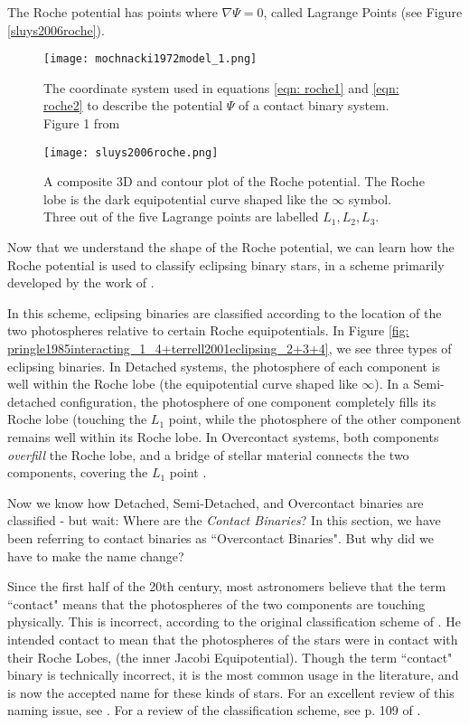 \documentclass[12pt]{article} %
\numberwithin{equation}{section} %
\begin{document}
The Roche potential has points where $\nabla \Psi = 0$, called Lagrange Points (see Figure \ref{sluys2006roche}). 

\begin{figure}[H]
\centering
\texttt{[image: mochnacki1972model\_1.png]}
\caption{The coordinate system used in equations \ref{eqn: roche1} and \ref{eqn: roche2} to describe the potential $\Psi$ of a contact binary system. Figure 1 from \citet{mochnacki1972model}}
\label{fig: mochnacki1972model_1}
\end{figure}

\begin{figure}[H]
\centering
\texttt{[image: sluys2006roche.png]}
\caption{A composite 3D and contour plot of the Roche potential. The Roche lobe is the dark equipotential curve shaped like the $\infty$ symbol. Three out of the five Lagrange points are labelled $L_{1}, L_{2}, L_{3}$.  \citep{sluys2006roche}}
\label{fig: sluys2006roche}
\end{figure}

Now that we understand the shape of the Roche potential, we can learn how the Roche potential is used to classify eclipsing binary stars, in a scheme primarily developed by the work of \citet{kopal1959close}.

In this scheme, eclipsing binaries are classified according to the location of the two photospheres relative to certain Roche equipotentials. In Figure \ref{fig: pringle1985interacting_1_4+terrell2001eclipsing_2+3+4}, we see three types of eclipsing binaries. In Detached systems, the photosphere of each component is well within the Roche lobe (the equipotential curve shaped like $\infty$). In a Semi-detached configuration, the photosphere of one component completely fills its Roche lobe (touching the $L_{1}$ point, while the photosphere of the other component remains well within its Roche lobe. In Overcontact systems, both components \emph{overfill} the Roche lobe, and a bridge of stellar material connects the two components, covering the $L_{1}$ point \citep{terrell2001eclipsing}.

Now we know how Detached, Semi-Detached, and Overcontact binaries are classified - but wait: Where are the \emph{Contact Binaries}? In this section, we have been referring to contact binaries as ``Overcontact Binaries". But why did we have to make the name change?

Since the first half of the 20th century, most astronomers believe that the term ``contact" means that the photospheres of the two components are touching physically. This is incorrect, according to the original classification scheme of \citet{kopal1959close}. He intended contact to mean that the photospheres of the stars were in contact with their Roche Lobes, (the inner Jacobi Equipotential). Though the term ``contact" binary is technically incorrect, it is the most common usage in the literature, and is now the accepted name for these kinds of stars. For an excellent review of this naming issue, see \citet{wilson2001binary}. For a review of the classification scheme, see p. 109 of \citet {kallrath2009eclipsing}.
\end{document}

